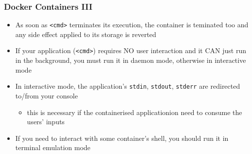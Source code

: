 \documentclass{beamer}\mode<presentation>{\usetheme{AMSBolognaFC}}
\begin{document}
\begin{frame}
\frametitle{Docker Containers III}
    \begin{itemize}

        \item As soon as \texttt{<cmd>} terminates its execution, the container is teminated too and any side effect applied to its storage is reverted

        \item If your application (\texttt{<cmd>}) requires NO user interaction and it CAN just run in the background, you must run it in daemon mode, otherwise in interactive mode

        \item In interactive mode, the application's \texttt{stdin}, \texttt{stdout}, \texttt{stderr} are redirected to/from your console
        \begin{itemize}
            \item this is necessary if the containerised applicationion need to consume the users' inputs
        \end{itemize}

        \item If you need to interact with some container's shell, you should run it in terminal emulation mode
    \end{itemize}

\end{frame}
\end{document}
